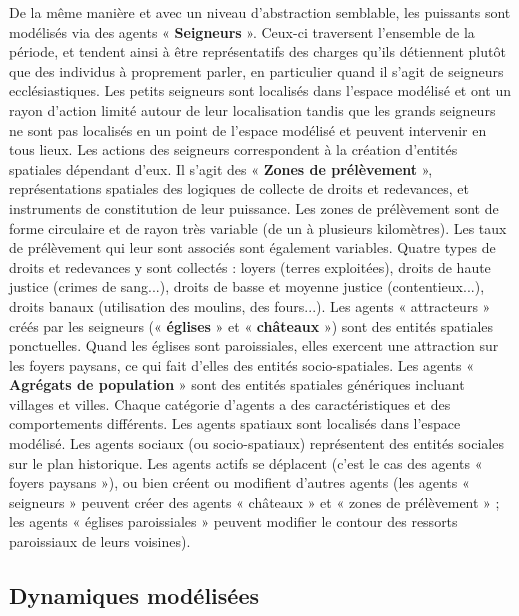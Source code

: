 De la même manière et avec un niveau d'abstraction semblable, les puissants sont modélisés via des agents « \textbf{Seigneurs} ».
Ceux-ci traversent l'ensemble de la période, et tendent ainsi à être représentatifs des charges qu'ils détiennent plutôt que des individus à proprement parler, en particulier quand il s'agit de seigneurs ecclésiastiques.
Les petits seigneurs sont localisés dans l'espace modélisé et ont un rayon d'action limité autour de leur localisation tandis que les grands seigneurs ne sont pas localisés en un point de l'espace modélisé et peuvent intervenir en tous lieux.
Les actions des seigneurs correspondent à la création d'entités spatiales dépendant d'eux.
Il s'agit des « \textbf{Zones de prélèvement} », représentations spatiales des logiques de collecte de droits et redevances, et instruments de constitution de leur puissance.
Les zones de prélèvement sont de forme circulaire et de rayon très variable (de un à plusieurs kilomètres).
Les taux de prélèvement qui leur sont associés sont également variables. 
Quatre types de droits et redevances y sont collectés : loyers (terres exploitées), droits de haute justice (crimes de sang...), droits de basse et moyenne justice (contentieux...), droits banaux (utilisation des moulins, des fours...).
Les agents « attracteurs » créés par les seigneurs (« \textbf{églises} » et « \textbf{châteaux} ») sont des entités spatiales ponctuelles.
Quand les églises sont paroissiales, elles exercent une attraction sur les foyers paysans, ce qui fait d'elles des entités socio-spatiales.
Les agents « \textbf{Agrégats de population} » sont des entités spatiales génériques incluant villages et villes.
Chaque catégorie d'agents a des caractéristiques et des comportements
différents.
Les agents spatiaux sont localisés dans l'espace modélisé.
Les agents sociaux (ou socio-spatiaux) représentent des entités sociales sur le plan historique.
Les agents actifs se déplacent (c'est le cas des agents « foyers paysans »), ou bien créent ou modifient d'autres agents (les agents « seigneurs » peuvent créer des agents « châteaux » et « zones de prélèvement » ; les agents « églises paroissiales » peuvent modifier le contour des ressorts paroissiaux de leurs voisines).

\subsection{Dynamiques modélisées}

